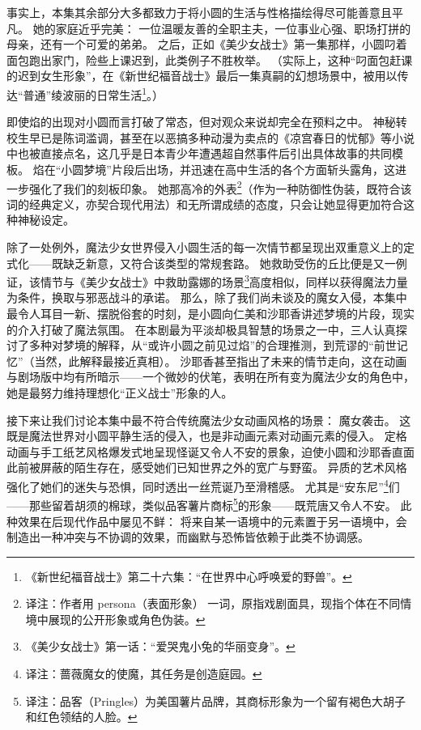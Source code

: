 事实上，本集其余部分大多都致力于将小圆的生活与性格描绘得尽可能善意且平凡。
她的家庭近乎完美：
一位温暖友善的全职主夫，一位事业心强、职场打拼的母亲，还有一个可爱的弟弟。
之后，正如《美少女战士》第一集那样，小圆叼着面包跑出家门，险些上课迟到，此类例子不胜枚举。
（实际上，这种“叼面包赶课的迟到女生形象”，在《新世纪福音战士》最后一集真嗣的幻想场景中，被用以传达“普通”绫波丽的日常生活\footnote{%
    《新世纪福音战士》第二十六集：“在世界中心呼唤爱的野兽”。
}\cite{ref14}。）

即使焰的出现对小圆而言打破了常态，但对观众来说却完全在预料之中。
神秘转校生早已是陈词滥调，甚至在以恶搞多种动漫为卖点的《凉宫春日的忧郁》等小说中也被直接点名\cite{ref15}，这几乎是日本青少年遭遇超自然事件后引出具体故事的共同模板。
焰在“小圆梦境”片段后出场，并迅速在高中生活的各个方面斩头露角，这进一步强化了我们的刻板印象。
她那高冷的外表\footnote{%
    译注：作者用 persona（表面形象） 一词，原指戏剧面具，现指个体在不同情境中展现的公开形象或角色伪装。
}（作为一种防御性伪装，既符合该词的经典定义，亦契合现代用法）和无所谓成绩的态度，只会让她显得更加符合这种神秘设定。

除了一处例外，魔法少女世界侵入小圆生活的每一次情节都呈现出双重意义上的定式化——既缺乏新意，又符合该类型的常规套路。
她救助受伤的丘比便是又一例证，该情节与《美少女战士》中救助露娜的场景\footnote{%
    《美少女战士》第一话：“爱哭鬼小兔的华丽变身”。
}高度相似，同样以获得魔法力量为条件，换取与邪恶战斗的承诺。
那么，除了我们尚未谈及的魔女入侵，本集中最令人耳目一新、摆脱俗套的时刻，是小圆向仁美和沙耶香讲述梦境的片段，现实的介入打破了魔法氛围。
在本剧最为平淡却极具智慧的场景之一中，三人认真探讨了多种对梦境的解释，从“或许小圆之前见过焰”的合理推测，到荒谬的“前世记忆”（当然，此解释最接近真相）。
沙耶香甚至指出了未来的情节走向，这在动画与剧场版中均有所暗示——一个微妙的伏笔，表明在所有变为魔法少女的角色中，她是最努力维持理想化“正义战士”形象的人。

接下来让我们讨论本集中最不符合传统魔法少女动画风格的场景：
魔女袭击。
这既是魔法世界对小圆平静生活的侵入，也是非动画元素对动画元素的侵入。
定格动画与手工纸艺风格爆发式地呈现怪诞又令人不安的景象，迫使小圆和沙耶香直面此前被屏蔽的陌生存在，感受她们已知世界之外的宽广与野蛮。
异质的艺术风格强化了她们的迷失与恐惧，同时透出一丝荒诞乃至滑稽感。
尤其是“安东尼”\footnote{%
    译注：蔷薇魔女的使魔，其任务是创造庭园。
}们——那些留着胡须的棉球，类似品客薯片商标\footnote{%
    译注：品客（Pringles）为美国薯片品牌，其商标形象为一个留有褐色大胡子和红色领结的人脸。
}的形象——既荒唐又令人不安。
此种效果在后现代作品中屡见不鲜：
将来自某一语境中的元素置于另一语境中，会制造出一种冲突与不协调的效果\cite{ref16}，而幽默\cite{ref17}与恐怖\cite{ref18}皆依赖于此类不协调感。

